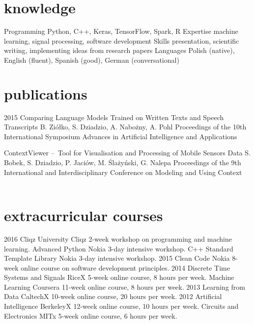 \documentclass[]{friggeri-cv_osx}
\begin{document}
\section{knowledge}
\begin{entrylist}
\entry
{}
{Programming}
{}
{Python, C++, Keras, TensorFlow, Spark, R}
\entry
{}
{Expertise}
{}
{machine learning, signal processing, software development}
\entry
{}
{Skills}
{}
{presentation, scientific writing, implementing ideas from research papers}
\entry
{}
{Languages}
{}
{Polish (native), English (fluent), Spanish (good), German (conversational)}
\end{entrylist}


\section{publications}
\begin{entrylist}
\entry
{2015}
{Comparing Language Models Trained on Written Texts and Speech Transcripts}
{B. Ziółko, S. Dziadzio, A. Nabożny, A. Pohl}
{Proceedings of the 10th International Symposium Advances in Artificial Intelligence and Applications\\}

\entry
{}
{ContextViewer – Tool for Visualisation and Processing of Mobile Sensors Data}
{S. Bobek, S. Dziadzio, P. Jaciów, M. Ślażyński, G. Nalepa}
{Proceedings of the 9th International and Interdisciplinary Conference on Modeling and Using Context\\\\}
\end{entrylist}


\section{extracurricular courses}
\begin{entrylist}
\entry
{2016}
{Cliqz University}
{Cliqz}
{2-week workshop on programming and machine learning.}
\entry
{}
{Advanced Python}
{Nokia}
{3-day intensive workshop.}
\entry
{}
{C++ Standard Template Library}
{Nokia}
{3-day intensive workshop.}
\entry
{2015}
{Clean Code}
{Nokia}
{8-week online course on software development principles.}
\entry
{2014}
{Discrete Time Systems and Signals}
{RiceX}
{5-week online course, 8 hours per week.}
\entry
{}
{Machine Learning}
{Coursera}
{11-week online course, 8 hours per week.}
\entry
{2013}
{Learning from Data}
{CaltechX}
{10-week online course, 20 hours per week.}
\entry
{2012}
{Artificial Intelligence}
{BerkeleyX}
{12-week online course, 10 hours per week.}
\entry
{}
{Circuits and Electronics}
{MITx}
{5-week online course, 6 hours per week.}
\end{entrylist}
\end{document}
